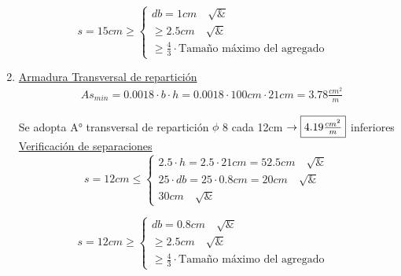 \begin{enumerate}
\[ s = 15cm \geq \left\{ \begin{array}{ll}
         db = 1cm \quad \surd & \\
         \geq 2.5cm \quad \surd &\\
         \geq \frac{4}{3} \cdot \text{Tamaño máximo del agregado} & \end{array} \right. \] 

\item \underline{Armadura Transversal de repartición}
\begin{align*}
& As_{min} = 0.0018 \cdot b \cdot h = 0.0018 \cdot 100cm \cdot 21cm = 3.78 \frac{cm^2}{m}
\end{align*}

Se adopta A° transversal de repartición $\phi$ 8 cada 12cm $\rightarrow \framebox{$4.19 \frac{cm^2}{m}$}$ inferiores\\

\underline{Verificación de separaciones}\\

\[ s = 12cm \leq \left\{ \begin{array}{ll}
         2.5 \cdot h = 2.5 \cdot 21cm = 52.5cm \quad \surd & \\
         25 \cdot db = 25 \cdot 0.8cm = 20cm \quad \surd &\\
         30cm \quad \surd & \end{array} \right. \] 
         
\[ s = 12cm \geq \left\{ \begin{array}{ll}
         db = 0.8cm \quad \surd & \\
         \geq 2.5cm \quad \surd &\\
         \geq \frac{4}{3} \cdot \text{Tamaño máximo del agregado} & \end{array} \right. \] 

\end{enumerate}